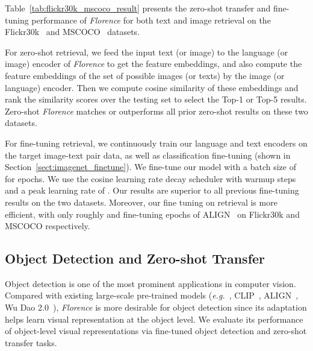 \documentclass{article}
\newcommand{\eg}{{\it{e.g.}~}}
\begin{document}
Table~\ref{tab:flickr30k_mscoco_result} presents the zero-shot transfer and fine-tuning performance
of \emph{Florence} for both text and image retrieval on the Flickr30k~\cite{plummer2016flickr30k}
and MSCOCO~\cite{lin2015microsoft} datasets.

For zero-shot retrieval, we feed the input text (or image) to the language (or image) encoder of
\emph{Florence} to get the feature embeddings, and also compute the feature embeddings of the set of
possible images (or texts) by the image (or language) encoder. Then we compute cosine similarity of
these embeddings and rank the similarity scores over the testing set to select the Top-1 or Top-5
results. Zero-shot \emph{Florence} matches or outperforms all prior zero-shot results on these two
datasets.

For fine-tuning retrieval, we continuously train our language and text encoders on the target
image-text pair data, as well as classification fine-tuning (shown in
Section~\ref{sect:imagenet_finetune}). We fine-tune our model with a batch size of  for 
epochs. We use the cosine learning rate decay scheduler with  warmup steps and a peak learning
rate of . Our results are superior to all previous fine-tuning results on the two
datasets. Moreover, our fine tuning on retrieval is more efficient, with only roughly  and  fine-tuning epochs of ALIGN~\cite{jia2021scaling} on Flickr30k and MSCOCO respectively.


\subsection{Object Detection and Zero-shot Transfer}

Object detection is one of the most prominent applications in computer vision. Compared with
existing large-scale pre-trained models (\eg, CLIP~\cite{radford2021learning},
ALIGN~\cite{jia2021scaling}, Wu Dao 2.0~\cite{Wudao2}), \emph{Florence} is more desirable for object
detection since its adaptation helps learn visual representation at the object level.  We evaluate
its performance of object-level visual representations via fine-tuned object
detection and zero-shot transfer tasks.
\end{document}
